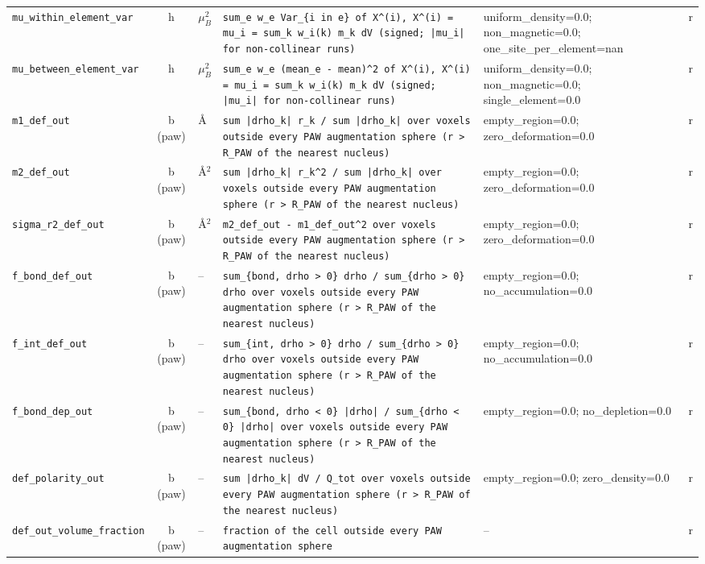 \begin{table}[p]
\begin{tabular}{p{3.3cm}cp{1.4cm}p{6.6cm}p{2.3cm}c}
\texttt{mu\_within\_element\_var} & h & $\mu_B^2$ & \texttt{sum\_e w\_e Var\_\{i in e\} of X\^{}(i),  X\^{}(i) = mu\_i = sum\_k w\_i(k) m\_k dV (signed; |mu\_i| for non-collinear runs)} & uniform\_density=0.0; non\_magnetic=0.0; one\_site\_per\_element=nan & r \\
\texttt{mu\_between\_element\_var} & h & $\mu_B^2$ & \texttt{sum\_e w\_e (mean\_e - mean)\^{}2 of X\^{}(i),  X\^{}(i) = mu\_i = sum\_k w\_i(k) m\_k dV (signed; |mu\_i| for non-collinear runs)} & uniform\_density=0.0; non\_magnetic=0.0; single\_element=0.0 & r \\
\texttt{m1\_def\_out} & b (paw) & \AA & \texttt{sum |drho\_k| r\_k / sum |drho\_k| over voxels outside every PAW augmentation sphere (r > R\_PAW of the nearest nucleus)} & empty\_region=0.0; zero\_deformation=0.0 & r \\
\texttt{m2\_def\_out} & b (paw) & \AA$^2$ & \texttt{sum |drho\_k| r\_k\^{}2 / sum |drho\_k| over voxels outside every PAW augmentation sphere (r > R\_PAW of the nearest nucleus)} & empty\_region=0.0; zero\_deformation=0.0 & r \\
\texttt{sigma\_r2\_def\_out} & b (paw) & \AA$^2$ & \texttt{m2\_def\_out - m1\_def\_out\^{}2 over voxels outside every PAW augmentation sphere (r > R\_PAW of the nearest nucleus)} & empty\_region=0.0; zero\_deformation=0.0 & r \\
\texttt{f\_bond\_def\_out} & b (paw) & -- & \texttt{sum\_\{bond, drho > 0\} drho / sum\_\{drho > 0\} drho over voxels outside every PAW augmentation sphere (r > R\_PAW of the nearest nucleus)} & empty\_region=0.0; no\_accumulation=0.0 & r \\
\texttt{f\_int\_def\_out} & b (paw) & -- & \texttt{sum\_\{int, drho > 0\} drho / sum\_\{drho > 0\} drho over voxels outside every PAW augmentation sphere (r > R\_PAW of the nearest nucleus)} & empty\_region=0.0; no\_accumulation=0.0 & r \\
\texttt{f\_bond\_dep\_out} & b (paw) & -- & \texttt{sum\_\{bond, drho < 0\} |drho| / sum\_\{drho < 0\} |drho| over voxels outside every PAW augmentation sphere (r > R\_PAW of the nearest nucleus)} & empty\_region=0.0; no\_depletion=0.0 & r \\
\texttt{def\_polarity\_out} & b (paw) & -- & \texttt{sum |drho\_k| dV / Q\_tot over voxels outside every PAW augmentation sphere (r > R\_PAW of the nearest nucleus)} & empty\_region=0.0; zero\_density=0.0 & r \\
\texttt{def\_out\_volume\_fraction} & b (paw) & -- & \texttt{fraction of the cell outside every PAW augmentation sphere} & -- & r \\

\end{tabular}
\end{table}
